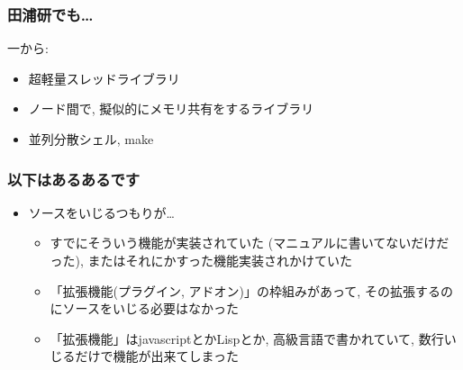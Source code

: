 \documentclass[12pt,dvipdfmx]{beamer}
\begin{document}
\begin{frame}
\frametitle{田浦研でも\ldots}
\item<2-> 一から:
  \begin{itemize}
  \item 超軽量スレッドライブラリ
  \item ノード間で, 擬似的にメモリ共有をするライブラリ
  \item 並列分散シェル, make
\end{itemize}
\end{frame}
\fi

\begin{frame}
\frametitle{以下はあるあるです}
\begin{itemize}
\item ソースをいじるつもりが\ldots

  \begin{itemize}
  \item<2-> すでにそういう機能が実装されていた
    (マニュアルに書いてないだけだった),
    またはそれにかすった機能実装されかけていた
    
  \item<3-> 「拡張機能(プラグイン, アドオン)」の枠組みがあって,
    その拡張するのにソースをいじる必要はなかった

  \item<4-> 「拡張機能」はjavascriptとかLispとか,
    高級言語で書かれていて, 数行いじるだけで機能が出来てしまった
  \end{itemize}
\end{itemize}
\end{frame}
\end{document}
